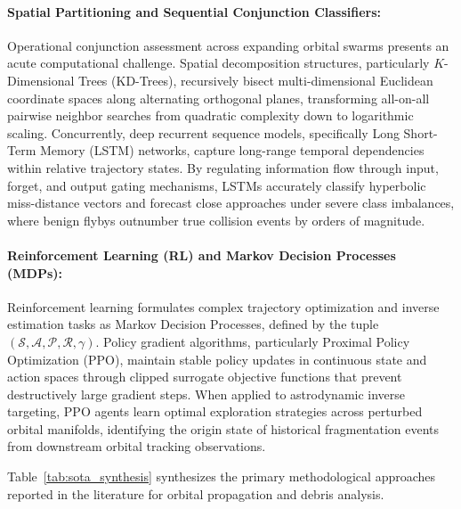 \paragraph{Spatial Partitioning and Sequential Conjunction Classifiers:}
Operational conjunction assessment across expanding orbital swarms presents an acute computational challenge. Spatial decomposition structures, particularly $K$-Dimensional Trees (KD-Trees), recursively bisect multi-dimensional Euclidean coordinate spaces along alternating orthogonal planes, transforming all-on-all pairwise neighbor searches from quadratic complexity down to logarithmic scaling. Concurrently, deep recurrent sequence models, specifically Long Short-Term Memory (LSTM) networks, capture long-range temporal dependencies within relative trajectory states. By regulating information flow through input, forget, and output gating mechanisms, LSTMs accurately classify hyperbolic miss-distance vectors and forecast close approaches under severe class imbalances, where benign flybys outnumber true collision events by orders of magnitude.

\paragraph{Reinforcement Learning (RL) and Markov Decision Processes (MDPs):}
Reinforcement learning formulates complex trajectory optimization and inverse estimation tasks as Markov Decision Processes, defined by the tuple $(\mathcal{S}, \mathcal{A}, \mathcal{P}, \mathcal{R}, \gamma)$. Policy gradient algorithms, particularly Proximal Policy Optimization (PPO), maintain stable policy updates in continuous state and action spaces through clipped surrogate objective functions that prevent destructively large gradient steps. When applied to astrodynamic inverse targeting, PPO agents learn optimal exploration strategies across perturbed orbital manifolds, identifying the origin state of historical fragmentation events from downstream orbital tracking observations.

Table~\ref{tab:sota_synthesis} synthesizes the primary methodological approaches reported in the literature for orbital propagation and debris analysis.

